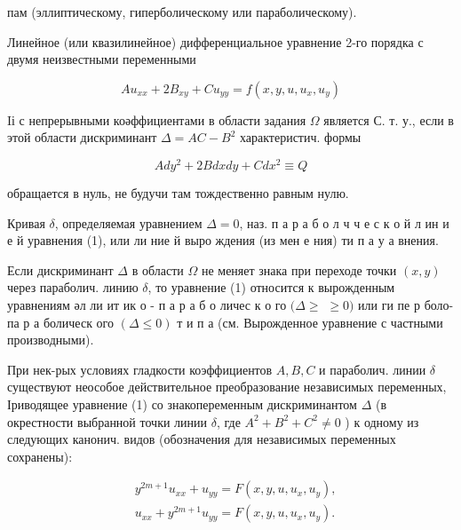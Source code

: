 \documentclass[10pt]{article}
\begin{document}
пам (эллиптическому, гиперболическому или параболическому).



Линейное (или квазилинейное) дифференциальное уравнение 2-го порядка с двумя неизвестными переменными



\[

A u_{x x}+2 B_{x y}+C u_{y y}=f\left(x, y, u, u_{x}, u_{y}\right)

\]



Iі с непрерывными коәффициентами в области задания $\Omega$ является С. т. у., если в этой области дискриминант $\Delta=A C-B^{2}$ характеристич. формы



\[

A d y^{2}+2 B d x d y+C d x^{2} \equiv Q

\]



обращается в нуль, не будучи там тождественно равным нулю.



Кривая $\delta$, определяемая уравнением $\Delta=0$, наз. п а р а б о л ч ч е с к о й л ин и е й уравнения (1), или ли ние й выро ждения (из мен е ния) ти п а у а внения.



Если дискриминант $\Delta$ в области $\Omega$ не меняет знака при переходе точки $(x, y)$ через параболич. линию $\delta$, то уравнение (1) относится к вырожденным уравнениям әл ли ит ик о - п а р а б о личес к о го $(\Delta \geqslant$ $\geqslant 0)$ или ги пе р боло-па р а болическ ого $(\Delta \leqslant 0)$ т и п а (см. Вырожденное уравнение с частными производными).



При нек-рых условиях гладкости коэффициентов $A, B, C$ и параболич. линии $\delta$ существуют неособое действительное преобразование независимых переменных, Іриводящее уравнение (1) со знакопеременным дискриминантом $\Delta$ (в окрестности выбранной точки линии $\delta$, где $A^{2}+B^{2}+C^{2} \neq 0$ ) к одному из следующих канонич. видов (обозначения для независимых переменных сохранены):



\[

\begin{aligned}

& y^{2 m+1} u_{x x}+u_{y y}=F\left(x, y, u, u_{x}, u_{y}\right), \\

& u_{x x}+y^{2 m+1} u_{y y}=F\left(x, y, u, u_{x}, u_{y}\right) .

\end{aligned}

\]
\end{document}
